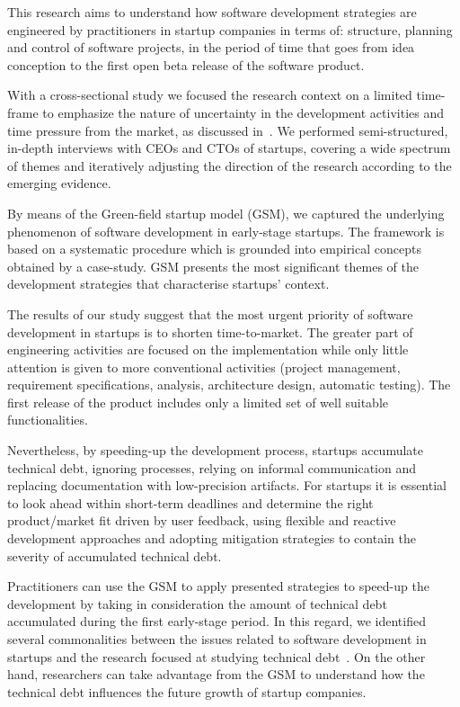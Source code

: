 \documentclass[10pt,journal,letterpaper,compsoc]{IEEEtran}
\begin{document}
This research aims to understand how software development strategies are
engineered by practitioners in startup companies in terms of: structure, 
planning and control of software projects, in the period of time that goes from 
idea conception to the first open beta release of the software product.

With a cross-sectional study we focused the research context on a limited 
time-frame to emphasize the nature of uncertainty in the development activities 
and time pressure from the market, as discussed in~\cite{Maccormack2001,
Eisenhardt1998}. We performed semi-structured, in-depth interviews with CEOs and
CTOs of startups, covering a wide spectrum of themes and iteratively
adjusting the direction of the research according to the emerging evidence.

By means of the Green-field startup model (GSM), we captured the underlying
phenomenon of software development in early-stage startups. The framework is
based on a systematic procedure which is grounded into empirical concepts
obtained by a case-study. GSM presents the most significant themes of the
development strategies that characterise startups' context.

The results of our study suggest that the most urgent priority of software
development in startups is to shorten time-to-market. The greater part of
engineering activities are focused on the implementation while only little
attention is given to more conventional activities (project management,
requirement specifications, analysis, architecture design, automatic testing).
The first release of the product includes only a limited set of well suitable
functionalities.

Nevertheless, by speeding-up the development process, startups accumulate
technical debt, ignoring processes, relying on informal communication and
replacing documentation with low-precision artifacts. For startups it is
essential to look ahead within short-term deadlines and determine the right
product/market fit driven by user feedback, using flexible and reactive
development approaches and adopting mitigation strategies to contain the
severity of accumulated technical debt.

Practitioners can use the GSM to apply presented strategies to speed-up the
development by taking in consideration the amount of technical debt accumulated
during the first early-stage period. In this regard, we identified several
commonalities between the issues related to software development in startups and
the research focused at studying technical debt~\cite{Nugroho2011,Izurieta2012}.
On the other hand, researchers can take advantage from the GSM to understand
how the technical debt influences the future growth of startup companies.
\end{document}
